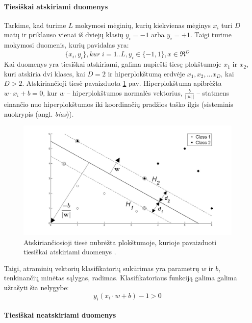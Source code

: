 \paragraph{Tiesiškai atskiriami duomenys}

Tarkime, kad turime $L$ mokymosi mėginių, kurių kiekvienas mėginys $x_i$ turi $D$ matų ir priklauso vienai iš dviejų klasių $y_i=-1$ arba $y_i=+1$. Taigi turime mokymosi duomenis, kurių pavidalas yra:
\begin{equation}
 \{x_i, y_i\}, kur\; i=1..L, y_i \in \{-1,1\}, x \in \Re^D
\end{equation}
Kai duomenys yra tiesiškai atskiriami, galima nupiešti tiesę plokštumoje $x_1$ ir $x_2$, kuri atskiria dvi klases, kai $D=2$ ir hiperplokštumą erdvėje $x_1, x_2,...x_D$, kai $D > 2$. Atskiriančioji tiesė pavaizduota \ref{fig:support_vector_machines} pav. Hiperplokštuma apibrėžta $w\cdot x_i + b = 0$, kur $w$ -- hiperplokštumos normalės vektorius, $\frac{b}{||w||}$ -- statmens einančio nuo hiperplokštumos iki koordinačių pradžios taško ilgis (sisteminis nuokrypis (angl. \textit{bias})).
\begin{figure}
 \centering
 \includegraphics[width=.7\textwidth]{images/support_vector_machines.jpg}
 \caption{Atskiriančiosioji tiesė nubrėžta plokštumoje, kurioje pavaizduoti tiesiškai atskiriami duomenys \cite{fletcher2009support}.}
 \label{fig:support_vector_machines}
\end{figure}

 Taigi, atraminių vektorių klasifikatorių sukūrimas yra parametrų $w$ ir $b$, tenkinančių minėtas sąlygas, radimas. Klasifikatoriaus funkciją galima galima užrašyti šia nelygybe:
\begin{equation}
 \label{svm_separable}
 y_i(x_i \cdot w + b) - 1 > 0
\end{equation}

\paragraph{Tiesiškai neatskiriami duomenys}

